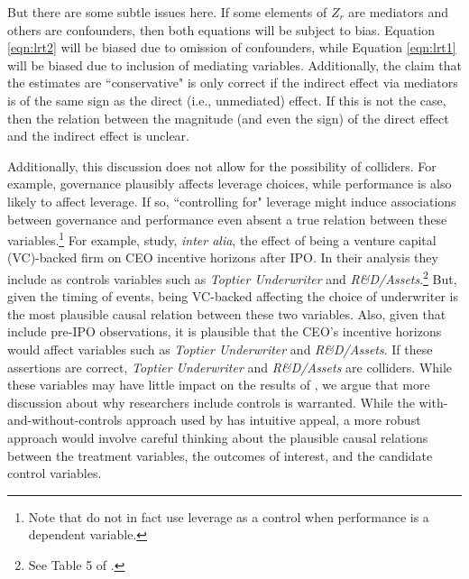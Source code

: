 \documentclass[11pt,reqno,titlepage]{amsart}
\begin{document}
\begin{doublespace}
But there are some subtle issues here.
If some elements of $Z_r$ are mediators and others are confounders, then both equations will be subject to bias. 
Equation \ref{eqn:lrt2} will be biased due to omission of confounders, while Equation \ref{eqn:lrt1}  will be biased due to inclusion of mediating variables.
Additionally, the claim that the estimates are ``conservative" is only correct if the indirect effect via mediators is of the same sign as the direct (i.e., unmediated) effect. 
If this is not the case, then the relation between the magnitude (and even the sign) of the direct effect and the indirect effect is unclear.

Additionally, this discussion does not allow for the possibility of colliders.
For example, governance plausibly affects leverage choices, while performance is also likely to affect leverage.
If so, ``controlling for" leverage might induce associations between governance and performance even absent a true relation between these variables.\footnote{
Note that \citet{Larcker:2007aa} do not in fact use leverage as a control when performance is a dependent variable.}
For example, \citet{Cadman:2014cr} study, \emph{inter alia}, the effect of being a venture capital (VC)-backed firm on CEO incentive horizons after IPO.
In their analysis they include as controls variables such as \emph{Toptier Underwriter} and \emph{R\&D/Assets}.\footnote{See Table 5 of \citet{Cadman:2014cr}.}
But, given the timing of events, being VC-backed affecting the choice of underwriter is the most plausible causal relation between these two variables.
Also, given that \citet{Cadman:2014cr} include pre-IPO observations, it is plausible that the CEO's incentive horizons would affect variables such as \emph{Toptier Underwriter} and \emph{R\&D/Assets}.
If these assertions are correct,  \emph{Toptier Underwriter} and \emph{R\&D/Assets} are colliders.
While these variables may have little impact on the results of \citet{Cadman:2014cr}, we argue that more discussion about why researchers include controls is warranted.
While the with-and-without-controls approach used by \citet{Larcker:2007aa} has intuitive appeal, a more robust approach would involve careful thinking about the plausible causal relations between the treatment variables, the outcomes of interest, and the candidate control variables.


\end{doublespace}
\end{document}
